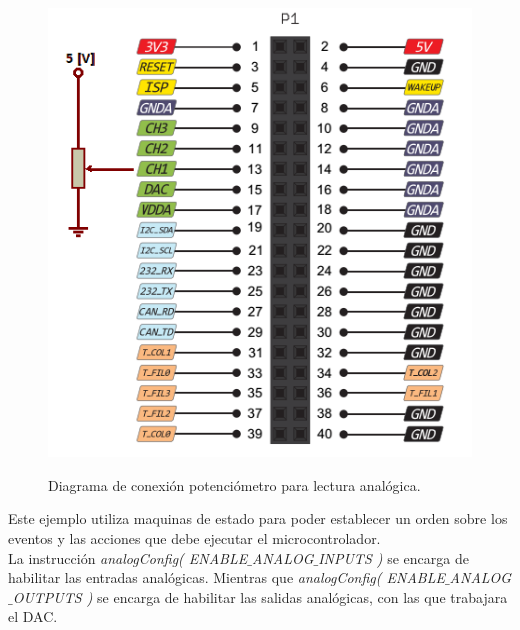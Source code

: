 \documentclass[12pt,letterpaper]{article}
\begin{document}
\begin{figure}[H]
\centering
\includegraphics[width=6 cm]{figuras/f6.png}\\
\caption{Diagrama de conexión potenciómetro para lectura analógica.}
\label{Fig24}
\end{figure}

Este ejemplo utiliza maquinas de estado para poder establecer un orden sobre los eventos y las acciones que debe ejecutar el microcontrolador.
 \\
 
La instrucción \textit{analogConfig( ENABLE$\_$ANALOG$\_$INPUTS )} se encarga de habilitar las entradas analógicas. Mientras que \textit{analogConfig( ENABLE$\_$ANALOG$\_$OUTPUTS )} se encarga de habilitar las salidas analógicas, con las que trabajara el DAC.
\end{document}

